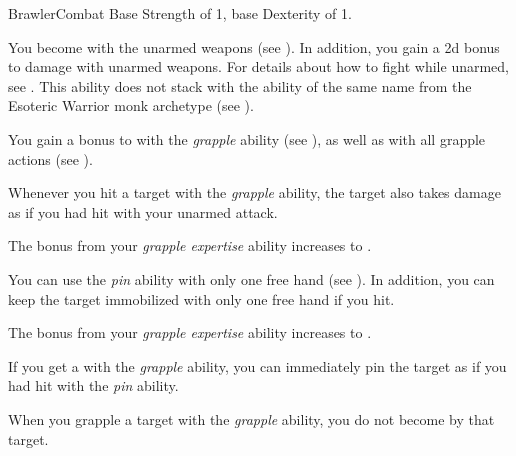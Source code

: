     \begin{feat}{Brawler}{Combat}
        \featpre Base Strength of 1, base Dexterity of 1.

         You become  with the unarmed weapons  (see ).
        In addition, you gain a \plus2d bonus to damage with unarmed weapons.
        For details about how to fight while unarmed, see .
        This ability does not stack with the ability of the same name from the Esoteric Warrior monk archetype (see ).

         You gain a  bonus to  with the \textit{grapple} ability (see ), as well as with all grapple actions (see ).

         Whenever you hit a target with the \textit{grapple} ability, the target also takes damage as if you had hit with your unarmed attack.

         The bonus from your \textit{grapple expertise} ability increases to .

         You can use the \textit{pin} ability with only one free hand (see ).
        In addition, you can keep the target immobilized with only one free hand if you hit.

         The bonus from your \textit{grapple expertise} ability increases to .

         If you get a  with the \textit{grapple} ability, you can immediately pin the target as if you had hit with the \textit{pin} ability.

         When you grapple a target with the \textit{grapple} ability, you do not become  by that target.
    \end{feat}

